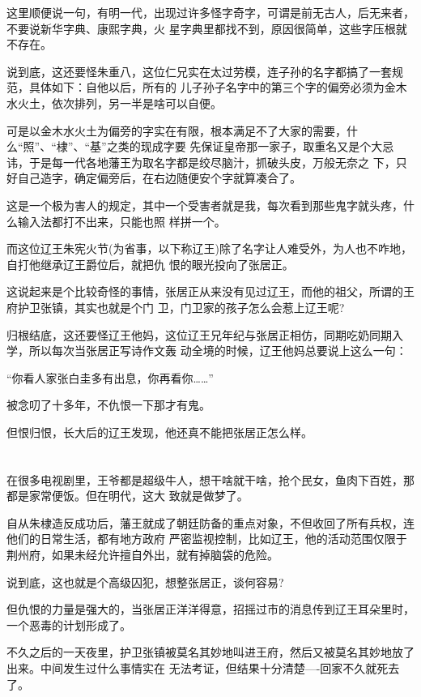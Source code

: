 \documentclass[11pt,a4paper,onecolumn]{article}
\begin{document}
这里顺便说一句，有明一代，出现过许多怪字奇字，可谓是前无古人，后无来者，不要说新华字典、康熙字典，火
星字典里都找不到，原因很简单，这些字压根就不存在。

说到底，这还要怪朱重八，这位仁兄实在太过劳模，连子孙的名字都搞了一套规范，具体如下：自他以后，所有的
儿子孙子名字中的第三个字的偏旁必须为金木水火土，依次排列，另一半是啥可以自便。

可是以金木水火土为偏旁的字实在有限，根本满足不了大家的需要，什么``照''、``棣''、``基''之类的现成字要
先保证皇帝那一家子，取重名又是个大忌讳，于是每一代各地藩王为取名字都是绞尽脑汁，抓破头皮，万般无奈之
下，只好自己造字，确定偏旁后，在右边随便安个字就算凑合了。

这是一个极为害人的规定，其中一个受害者就是我，每次看到那些鬼字就头疼，什么输入法都打不出来，只能也照
样拼一个。

而这位辽王朱宪火节(为省事，以下称辽王)除了名字让人难受外，为人也不咋地，自打他继承辽王爵位后，就把仇
恨的眼光投向了张居正。

这说起来是个比较奇怪的事情，张居正从来没有见过辽王，而他的祖父，所谓的王府护卫张镇，其实也就是个门
卫，门卫家的孩子怎么会惹上辽王呢?

归根结底，这还要怪辽王他妈，这位辽王兄年纪与张居正相仿，同期吃奶同期入学，所以每次当张居正写诗作文轰
动全境的时候，辽王他妈总要说上这么一句：

``你看人家张白圭多有出息，你再看你……''

被念叨了十多年，不仇恨一下那才有鬼。

但恨归恨，长大后的辽王发现，他还真不能把张居正怎么样。

\section[\thesection]{}

在很多电视剧里，王爷都是超级牛人，想干啥就干啥，抢个民女，鱼肉下百姓，那都是家常便饭。但在明代，这大
致就是做梦了。

自从朱棣造反成功后，藩王就成了朝廷防备的重点对象，不但收回了所有兵权，连他们的日常生活，都有地方政府
严密监视控制，比如辽王，他的活动范围仅限于荆州府，如果未经允许擅自外出，就有掉脑袋的危险。

说到底，这也就是个高级囚犯，想整张居正，谈何容易?

但仇恨的力量是强大的，当张居正洋洋得意，招摇过市的消息传到辽王耳朵里时，一个恶毒的计划形成了。

不久之后的一天夜里，护卫张镇被莫名其妙地叫进王府，然后又被莫名其妙地放了出来。中间发生过什么事情实在
无法考证，但结果十分清楚----回家不久就死去了。
\end{document}
